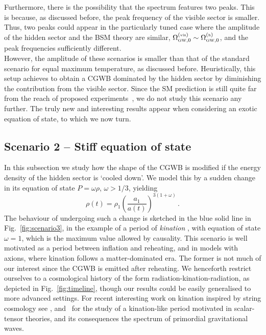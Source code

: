 \documentclass[a4paper,11pt]{article}
\newcommand{\lr}[1]{\left(#1\right)}
\begin{document}
Furthermore, there is the possibility that the spectrum features two peaks. This is because, as discussed before, the peak frequency of the visible sector is smaller. Thus, two peaks could appear in the particularly tuned case where the amplitude of the hidden sector and the BSM theory are similar, $\Omega^{(\text{\tiny{vis}})}_{\text{\tiny{GW}},0} \sim \Omega^{(\text{\tiny{h}})}_{\text{\tiny{GW}},0}$, and the peak frequencies sufficiently different.\\

However, the amplitude of these scenarios is smaller than that of the standard scenario for equal maximum temperature, as discussed before. 
Heuristically, this setup achieves to obtain a CGWB dominated by the hidden sector by diminishing the contribution from the visible sector.
Since the SM prediction is still quite far from the reach of proposed experiments~\cite{Aggarwal:2020olq}, we do not study this scenario any further. 
The truly new and interesting results appear when considering an exotic equation of state, to which we now turn.

\subsection{Scenario 2 -- Stiff equation of state}\label{sec:kination}

In this subsection we study how the shape of the CGWB is modified if the energy density of the hidden sector is `cooled down'. We model this by a sudden change in its equation of state $P=\omega \rho$, $\omega>1/3$, yielding
\begin{equation}\label{eq: rho redshift}
    \rho(t)=\rho_1\lr{\frac{a_1}{a(t)}}^{3(1+\omega)} \,.
\end{equation}
The behaviour of undergoing such a change is sketched in the blue solid line in Fig.~\ref{fig:scenario3}, in the example of a period of \textit{kination} \cite{Gouttenoire:2021jhk}, with equation of state $\omega=1$, which is the maximum value allowed by causality. This scenario is well motivated as a period between inflation and reheating, and in models with axions, where kination follows a matter-dominated era.
The former is not much of our interest since the CGWB is emitted after reheating.
We henceforth restrict ourselves to a cosmological history of the form radiation-kination-radiation, as depicted in Fig.~\ref{fig:timeline},
though our results could be easily generalised to more advanced settings. For recent interesting work on kination inspired by string cosmology see \cite{Conlon:2022pnx, Apers:2022cyl}, and~\cite{Chowdhury:2022gdc} for the study of a kination-like period motivated in scalar-tensor theories, and its consequences the spectrum of primordial gravitational waves.
\end{document}
